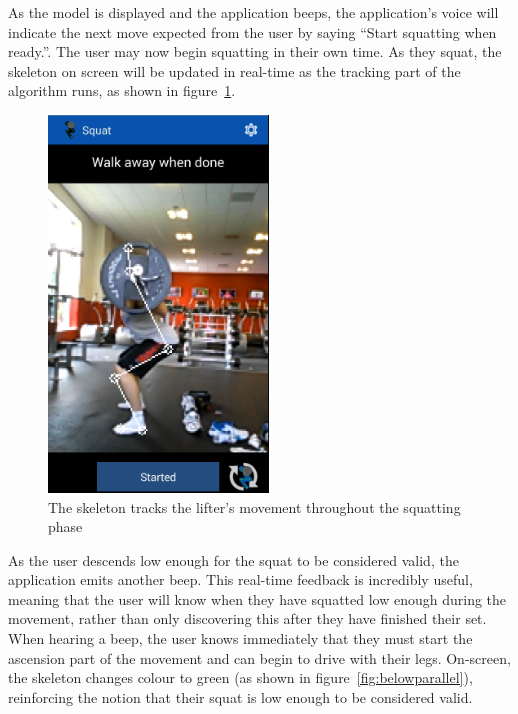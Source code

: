 As the model is displayed and the application beeps, the application's voice will indicate the next move expected from the user by saying ``Start squatting when ready.''. The user may now begin squatting in their own time. As they squat, the skeleton on screen will be updated in real-time as the tracking part of the algorithm runs, as shown in figure~\ref{fig:midsquat}.

\begin{figure}[H]
    \centering
	\includegraphics[height=10cm]{application/images/midsquat}
\caption{The skeleton tracks the lifter's movement throughout the squatting phase}
\label{fig:midsquat}
\end{figure}

As the user descends low enough for the squat to be considered valid, the application emits another beep. This real-time feedback is incredibly useful, meaning that the user will know when they have squatted low enough during the movement, rather than only discovering this after they have finished their set. When hearing a beep, the user knows immediately that they must start the ascension part of the movement and can begin to drive with their legs. On-screen, the skeleton changes colour to green (as shown in figure~\ref{fig:belowparallel}), reinforcing the notion that their squat is low enough to be considered valid.

